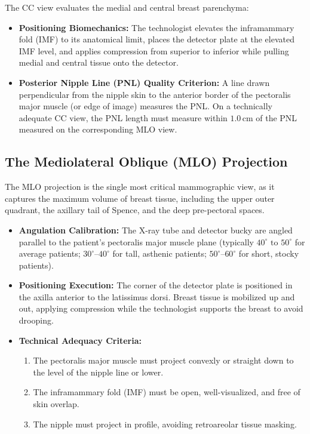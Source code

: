 \documentclass[11pt,a4paper]{article}
\begin{document}
The CC view evaluates the medial and central breast parenchyma:
\begin{itemize}[leftmargin=*]
    \item \textbf{Positioning Biomechanics:} The technologist elevates the inframammary fold (IMF) to its anatomical limit, places the detector plate at the elevated IMF level, and applies compression from superior to inferior while pulling medial and central tissue onto the detector.
    \item \textbf{Posterior Nipple Line (PNL) Quality Criterion:} A line drawn perpendicular from the nipple skin to the anterior border of the pectoralis major muscle (or edge of image) measures the PNL. On a technically adequate CC view, the PNL length must measure within \textbf{$1.0\,\text{cm}$} of the PNL measured on the corresponding MLO view.
\end{itemize}

\subsection{The Mediolateral Oblique (MLO) Projection}

The MLO projection is the single most critical mammographic view, as it captures the maximum volume of breast tissue, including the upper outer quadrant, the axillary tail of Spence, and the deep pre-pectoral spaces.

\begin{itemize}[leftmargin=*]
    \item \textbf{Angulation Calibration:} The X-ray tube and detector bucky are angled parallel to the patient's pectoralis major muscle plane (typically $40^\circ\text{ to }50^\circ$ for average patients; $30^\circ\text{--}40^\circ$ for tall, asthenic patients; $50^\circ\text{--}60^\circ$ for short, stocky patients).
    \item \textbf{Positioning Execution:} The corner of the detector plate is positioned in the axilla anterior to the latissimus dorsi. Breast tissue is mobilized up and out, applying compression while the technologist supports the breast to avoid drooping.
    \item \textbf{Technical Adequacy Criteria:}
    \begin{enumerate}
        \item The pectoralis major muscle must project convexly or straight down to the level of the nipple line or lower.
        \item The inframammary fold (IMF) must be open, well-visualized, and free of skin overlap.
        \item The nipple must project in profile, avoiding retroareolar tissue masking.
    \end{enumerate}
\end{itemize}
\end{document}
